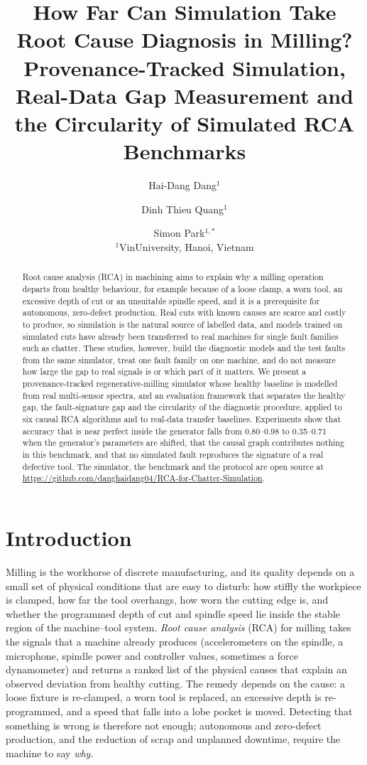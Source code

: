 \documentclass[11pt]{article}
\title{How Far Can Simulation Take Root Cause Diagnosis in Milling?\\
Provenance-Tracked Simulation, Real-Data Gap Measurement and the Circularity of Simulated RCA Benchmarks}
\author{Hai-Dang Dang$^{1}$ \and Dinh Thieu Quang$^{1}$ \and Simon Park$^{1,*}$\\[3pt]
{\normalsize $^{1}$VinUniversity, Hanoi, Vietnam}\\[2pt]
{\normalsize \fake{hai-dang.dang@vinuni.edu.vn \quad dinh.quang@vinuni.edu.vn \quad $^{*}$simon.park@vinuni.edu.vn}}}   %
\date{}
\begin{document}
\maketitle

\begin{abstract}
Root cause analysis (RCA) in machining aims to explain why a milling operation departs from healthy behaviour, for example because of a loose clamp, a worn tool, an excessive depth of cut or an unsuitable spindle speed, and it is a prerequisite for autonomous, zero-defect production.
Real cuts with known causes are scarce and costly to produce, so simulation is the natural source of labelled data, and models trained on simulated cuts have already been transferred to real machines for single fault families such as chatter.
These studies, however, build the diagnostic models and the test faults from the same simulator, treat one fault family on one machine, and do not measure how large the gap to real signals is or which part of it matters.
We present a provenance-tracked regenerative-milling simulator whose healthy baseline is modelled from real multi-sensor spectra, and an evaluation framework that separates the healthy gap, the fault-signature gap and the circularity of the diagnostic procedure, applied to six causal RCA algorithms and to real-data transfer baselines.
Experiments show that accuracy that is near perfect inside the generator falls from 0.80--0.98 to 0.35--0.71 when the generator's parameters are shifted, that the causal graph contributes nothing in this benchmark, and that no simulated fault reproduces the signature of a real defective tool.
The simulator, the benchmark and the protocol are open source at \url{https://github.com/danghaidang04/RCA-for-Chatter-Simulation}.
\end{abstract}

\section{Introduction}\label{sec:intro}
Milling is the workhorse of discrete manufacturing, and its quality depends on a small set of physical conditions that are easy to disturb: how stiffly the workpiece is clamped, how far the tool overhangs, how worn the cutting edge is, and whether the programmed depth of cut and spindle speed lie inside the stable region of the machine--tool system.
\emph{Root cause analysis} (RCA) for milling takes the signals that a machine already produces (accelerometers on the spindle, a microphone, spindle power and controller values, sometimes a force dynamometer) and returns a ranked list of the physical causes that explain an observed deviation from healthy cutting.
The remedy depends on the cause: a loose fixture is re-clamped, a worn tool is replaced, an excessive depth is re-programmed, and a speed that falls into a lobe pocket is moved.
Detecting that something is wrong is therefore not enough; autonomous and zero-defect production, and the reduction of scrap and unplanned downtime, require the machine to say \emph{why}.
\end{document}
